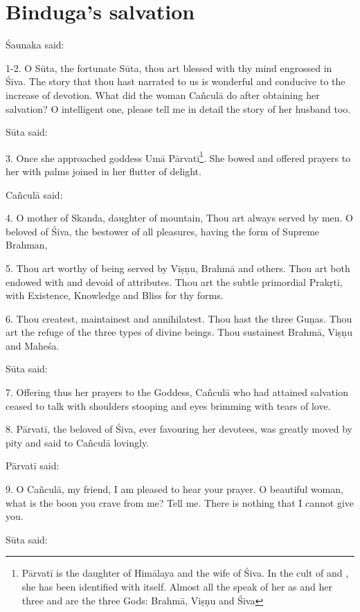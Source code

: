 \chapter{Binduga’s salvation}

Śaunaka said:

1-2. O Sūta, the fortunate Sūta, thou art blessed with thy mind engrossed in
Śiva. The story that thou hast narrated to us is wonderful and conducive to the
increase of devotion. What did the woman Cañculā do after obtaining her
salvation? O intelligent one, please tell me in detail the story of her husband
too.

Sūta said:

3. Once she approached goddess Umā Pārvatī\footnote{Pārvatī is the daughter of
Himālaya and the wife of Śiva. In the cult of  and , she
has been identified with  itself. Almost all the  speak
of her as  and her three  and  are
the three Gods: Brahmā, Viṣṇu and Śiva}. She bowed and offered prayers to her
with palms joined in her flutter of delight.

Cañculā said:

4. O mother of Skanda, daughter of mountain, Thou art always served by men. O
beloved of Śiva, the bestower of all pleasures, having the form of Supreme
Brahman,

5. Thou art worthy of being served by Viṣṇu, Brahmā and others. Thou art both
endowed with and devoid of attributes. Thou art the subtle primordial Prakṛti,
with Existence, Knowledge and Bliss for thy forms.

6. Thou createst, maintainest and annihilatest. Thou hast the three Guṇas. Thou
art the refuge of the three types of divine beings. Thou sustainest Brahmā,
Viṣṇu and Maheśa.

Sūta said:

7. Offering thus her prayers to the Goddess, Cañculā who had attained salvation
ceased to talk with shoulders stooping and eyes brimming with tears of love.

8. Pārvatī, the beloved of Śiva, ever favouring her devotees, was greatly moved
by pity and said to Cañculā lovingly.

Pārvatī said:

9. O Cañculā, my friend, I am pleased to hear your prayer. O beautiful woman,
what is the boon you crave from me? Tell me. There is nothing that I cannot give
you.

Sūta said:

